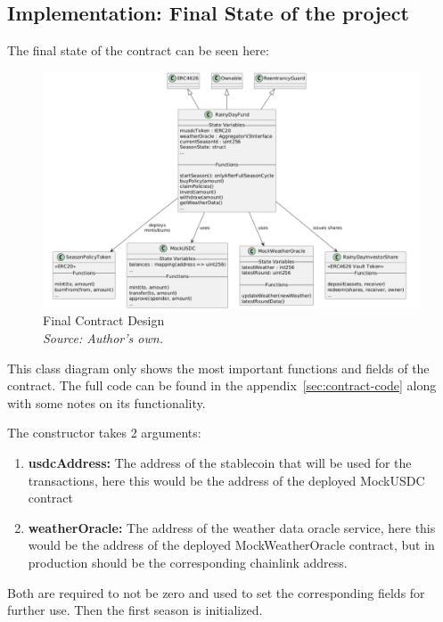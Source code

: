 \documentclass[11pt,a4paper]{article}
\begin{document}
    \subsection{Implementation: Final State of the project}\label{subsec:final-state}

    The final state of the contract can be seen here:

    \begin{figure}[H]
        \centering
        \includegraphics[scale=0.5]{graphics/ClassDiagram_New}
        \caption{Final Contract Design \\ \textit{Source: Author's own.}}
        \label{fig:final-contract-design}
    \end{figure}

    This class diagram only shows the most important functions and fields of the contract.
    The full code can be found in the appendix~\ref{sec:contract-code} along with some notes on its functionality.

    The constructor takes 2 arguments:
    \begin{enumerate}[(1)]
        \item \textbf{usdcAddress:} The address of the stablecoin that will be used for the transactions, here this would be the address of the deployed MockUSDC contract
        \item \textbf{weatherOracle:} The address of the weather data oracle service, here this would be the address of the deployed MockWeatherOracle contract, but in production should be the corresponding chainlink address.
    \end{enumerate}

    Both are required to not be zero and used to set the corresponding fields for further use.
    Then the first season is initialized.
\end{document}
